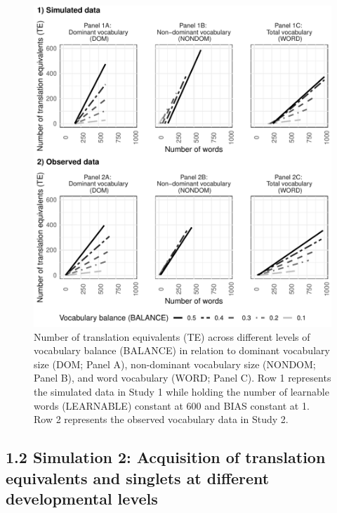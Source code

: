 \documentclass[
  english,
  ,man,floatsintext]{apa6}
\begin{document}
\begin{figure}[H]

{\centering \includegraphics[width=1.1\linewidth,height=0.8\textheight]{paper_TE_bilingual_vocabulary_model_files/figure-latex/fig1-1} 

}

\caption{Number of translation equivalents (TE) across different levels of vocabulary balance (BALANCE) in relation to dominant vocabulary size (DOM; Panel A), non-dominant vocabulary size (NONDOM; Panel B), and word vocabulary (WORD; Panel C). Row 1 represents the simulated data in Study 1 while holding the number of learnable words (LEARNABLE) constant at 600 and BIAS constant at 1. Row 2 represents the observed vocabulary data in Study 2.}\label{fig:fig1}
\end{figure}

\hypertarget{simulation-2-acquisition-of-translation-equivalents-and-singlets-at-different-developmental-levels}{%
\subsection{1.2 Simulation 2: Acquisition of translation equivalents and singlets at different developmental levels}\label{simulation-2-acquisition-of-translation-equivalents-and-singlets-at-different-developmental-levels}}
\end{document}
